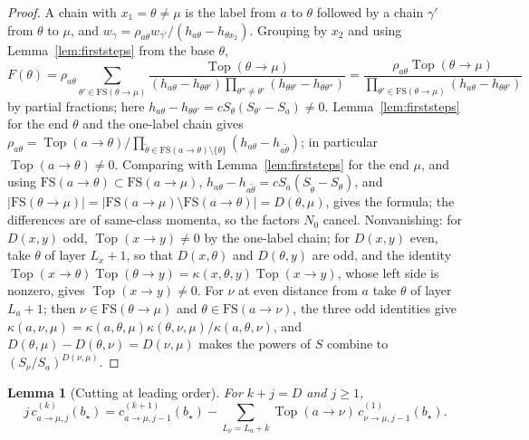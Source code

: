 \documentclass[11pt]{article}
\newtheorem{lemma}[theorem]{Lemma}
\theoremstyle{remark}
\begin{document}
\begin{proof}
A chain with $x_1=\theta\ne\mu$ is the label from $a$ to $\theta$ followed by a
chain $\gamma'$ from $\theta$ to $\mu$, and $w_\gamma=\rho_{a\theta}w_{\gamma'}/
(h_{a\theta}-h_{\theta x_2})$.  Grouping by $x_2$ and using
Lemma~\ref{lem:firststeps} from the base $\theta$,
\[
 F(\theta)=\rho_{a\theta}\sum_{\theta'\in\mathrm{FS}(\theta\to\mu)}
 \frac{\operatorname{Top}(\theta\to\mu)}{(h_{a\theta}-h_{\theta\theta'})
 \prod_{\theta''\ne\theta'}(h_{\theta\theta'}-h_{\theta\theta''})}
 =\frac{\rho_{a\theta}\operatorname{Top}(\theta\to\mu)}
 {\prod_{\theta'\in\mathrm{FS}(\theta\to\mu)}(h_{a\theta}-h_{\theta\theta'})}
\]
by partial fractions; here $h_{a\theta}-h_{\theta\theta'}=cS_\theta(S_{\theta'}-S_a)\ne0$.
Lemma~\ref{lem:firststeps} for the end $\theta$ and the one-label chain gives
$\rho_{a\theta}=\operatorname{Top}(a\to\theta)/\prod_{\tilde\theta\in\mathrm{FS}(a\to\theta)\setminus\{\theta\}}
(h_{a\theta}-h_{a\tilde\theta})$; in particular
$\operatorname{Top}(a\to\theta)\ne0$.  Comparing with
Lemma~\ref{lem:firststeps} for the end $\mu$, and using
$\mathrm{FS}(a\to\theta)\subset\mathrm{FS}(a\to\mu)$,
$h_{a\theta}-h_{a\tilde\theta}=cS_a(S_{\tilde\theta}-S_\theta)$, and
$|\mathrm{FS}(\theta\to\mu)|=|\mathrm{FS}(a\to\mu)\setminus\mathrm{FS}(a\to\theta)|=D(\theta,\mu)$,
gives the formula; the differences are of same-class momenta, so the factors
$N_0$ cancel.  Nonvanishing: for $D(x,y)$ odd, $\operatorname{Top}(x\to y)\ne0$ by
the one-label chain; for $D(x,y)$ even, take $\theta$ of layer $L_x+1$, so that
$D(x,\theta)$ and $D(\theta,y)$ are odd, and the identity
$\operatorname{Top}(x\to\theta)\operatorname{Top}(\theta\to y)
=\kappa(x,\theta,y)\operatorname{Top}(x\to y)$, whose left side is nonzero, gives
$\operatorname{Top}(x\to y)\ne0$.  For $\nu$ at even distance from $a$ take
$\theta$ of layer $L_a+1$; then $\nu\in\mathrm{FS}(\theta\to\mu)$ and
$\theta\in\mathrm{FS}(a\to\nu)$, the three odd identities give
$\kappa(a,\nu,\mu)=\kappa(a,\theta,\mu)\kappa(\theta,\nu,\mu)/\kappa(a,\theta,\nu)$,
and $D(\theta,\mu)-D(\theta,\nu)=D(\nu,\mu)$ makes the powers of $S$ combine to
$(S_\nu/S_a)^{D(\nu,\mu)}$.
\end{proof}

\begin{lemma}[Cutting at leading order]\label{lem:cut0}
For $k+j=D$ and $j\ge1$,
\[
 j\,c^{(k)}_{a\to\mu,j}(b_\star)=c^{(k+1)}_{a\to\mu,j-1}(b_\star)
 -\sum_{L_\nu=L_a+k}\operatorname{Top}(a\to\nu)\,c^{(1)}_{\nu\to\mu,j-1}(b_\star).
\]
\end{lemma}
\end{document}
